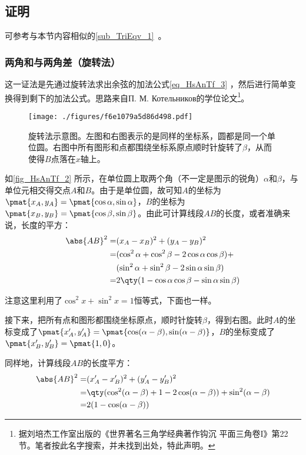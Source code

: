 \subsection{证明}

可参考与本节内容相似的\autoref{sub_TriEqv_1}~。

\subsubsection{两角和与两角差（旋转法）}

这一证法是先通过旋转法求出余弦的加法公式\autoref{eq_HsAnTf_3} ，然后进行简单变换得到剩下的加法公式。思路来自П. М. Котельников的学位论文\footnote{据刘培杰工作室出版的《世界著名三角学经典著作钩沉 平面三角卷I》第22节。笔者按此名字搜索，并未找到出处，特此声明。}。

\begin{figure}[ht]
\centering
\texttt{[image: ./figures/f6e1079a5d86d498.pdf]}
\caption{旋转法示意图。左图和右图表示的是同样的坐标系，圆都是同一个单位圆。右图中所有图形和点都围绕坐标系原点顺时针旋转了$\beta$，从而使得$B$点落在$x$轴上。} \label{fig_HsAnTf_2}
\end{figure}


如\autoref{fig_HsAnTf_2} 所示，在单位圆上取两个角（不一定是图示的锐角）$\alpha$和$\beta$，与单位元相交得交点$A$和$B$。由于是单位圆，故可知$A$的坐标为$\pmat{x_A, y_A}=\pmat{\cos\alpha, \sin\alpha}$，$B$的坐标为$\pmat{x_B, y_B}=\pmat{\cos\beta, \sin\beta}$。由此可计算线段$AB$的长度，或者准确来说，长度的平方：
\begin{equation}\label{eq_HsAnTf_1}
\begin{aligned}
\abs{AB}^2 =& (x_A-x_B)^2+(y_A-y_B)^2\\
=& (\cos^2\alpha+\cos^2\beta-2\cos\alpha\cos\beta)+\\&(\sin^2\alpha+\sin^2\beta-2\sin\alpha\sin\beta)\\
=& 2\qty(1-\cos\alpha\cos\beta-\sin\alpha\sin\beta)
\end{aligned}
\end{equation}

注意这里利用了$\cos^2x+\sin^2x=1$恒等式，下面也一样。

接下来，把所有点和图形都围绕坐标原点，顺时针旋转$\beta$，得到右图。此时$A$的坐标变成了$\pmat{x'_A, y'_A}=\pmat{\cos(\alpha-\beta), \sin(\alpha-\beta)}$，$B$的坐标变成了$\pmat{x'_B, y'_B}=\pmat{1, 0}$。

同样地，计算线段$AB$的长度平方：
\begin{equation}\label{eq_HsAnTf_2}
\begin{aligned}
\abs{AB}^2 =& (x'_A-x'_B)^2+(y'_A-y'_B)^2\\
=& \qty(\cos^2(\alpha-\beta)+1-2\cos(\alpha-\beta))+\sin^2(\alpha-\beta)\\
=& 2(1-\cos(\alpha-\beta))
\end{aligned}
\end{equation}

